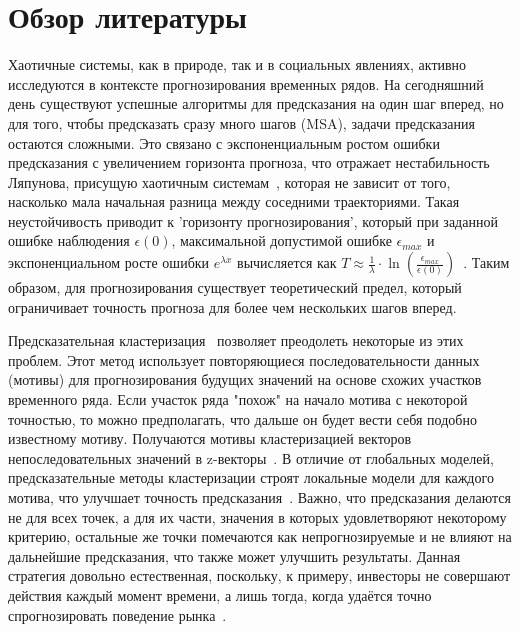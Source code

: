 \documentclass[a4paper, 12pt]{extarticle}
\begin{document}
\section{Обзор литературы}

Хаотичные системы, как в природе, так и в социальных явлениях, активно исследуются в контексте прогнозирования временных рядов. На сегодняшний день существуют успешные алгоритмы для предсказания на один шаг вперед, но для того, чтобы предсказать сразу много шагов (MSA), задачи предсказания остаются сложными. Это связано с экспоненциальным ростом ошибки предсказания с увеличением горизонта прогноза, что отражает нестабильность Ляпунова, присущую хаотичным системам~\cite{Kantz03}, которая не зависит от того, насколько мала начальная разница между соседними траекториями. Такая неустойчивость приводит к 'горизонту прогнозирования', который при заданной ошибке наблюдения $\epsilon(0)$, максимальной допустимой ошибке $\epsilon_{max}$ и экспоненциальном росте ошибки $e^{\lambda x}$ вычисляется как $T\approx \frac{1}{\lambda}\cdot\ln{\left(\frac{\epsilon_{max}}{\epsilon(0)}\right)}$~\cite{Potapov00}. Таким образом, для прогнозирования существует теоретический предел, который ограничивает точность прогноза для более чем нескольких шагов вперед.

Предсказательная кластеризация~\cite{Blockeel98} позволяет преодолеть некоторые из этих проблем. Этот метод использует повторяющиеся последовательности данных (мотивы) для прогнозирования будущих значений на основе схожих участков временного ряда. Если участок ряда "похож" на начало мотива с некоторой точностью, то можно предполагать, что дальше он будет вести себя подобно известному мотиву. Получаются мотивы кластеризацией векторов непоследовательных значений в z-векторы~\cite{Small05}. В отличие от глобальных моделей, предсказательные методы кластеризации строят локальные модели для каждого мотива, что улучшает точность предсказания~\cite{Taieb10}. Важно, что предсказания делаются не для всех точек, а для их части, значения в которых удовлетворяют некоторому критерию, остальные же точки помечаются как непрогнозируемые и не влияют на дальнейшие предсказания, что также может улучшить результаты. Данная стратегия довольно естественная, поскольку, к примеру, инвесторы не совершают действия каждый момент времени, а лишь тогда, когда удаётся точно спрогнозировать поведение рынка~\cite{Gromov15}.
\end{document}
